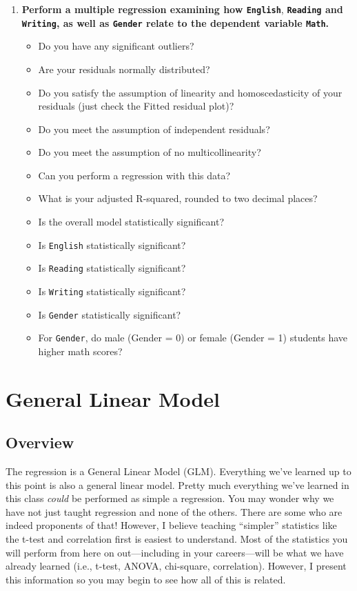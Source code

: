 \documentclass[
]{book}
\begin{document}
\begin{enumerate}
\def\labelenumi{\arabic{enumi}.}
\item
  \textbf{Perform a multiple regression examining how \texttt{English}}, \textbf{\texttt{Reading} and \texttt{Writing}, as well as \texttt{Gender} relate to the dependent variable \texttt{Math}.}

  \begin{itemize}
  \item
    Do you have any significant outliers?
  \item
    Are your residuals normally distributed?
  \item
    Do you satisfy the assumption of linearity and homoscedasticity of your residuals (just check the Fitted residual plot)?
  \item
    Do you meet the assumption of independent residuals?
  \item
    Do you meet the assumption of no multicollinearity?
  \item
    Can you perform a regression with this data?
  \item
    What is your adjusted R-squared, rounded to two decimal places?
  \item
    Is the overall model statistically significant?
  \item
    Is \texttt{English} statistically significant?
  \item
    Is \texttt{Reading} statistically significant?
  \item
    Is \texttt{Writing} statistically significant?
  \item
    Is \texttt{Gender} statistically significant?
  \item
    For \texttt{Gender}, do male (Gender = 0) or female (Gender = 1) students have higher math scores?
  \end{itemize}
\end{enumerate}

\hypertarget{general-linear-model}{%
\section{General Linear Model}\label{general-linear-model}}

\hypertarget{overview-12}{%
\subsection{Overview}\label{overview-12}}

The regression is a General Linear Model (GLM). Everything we've learned up to this point is also a general linear model. Pretty much everything we've learned in this class \emph{could} be performed as simple a regression. You may wonder why we have not just taught regression and none of the others. There are some who are indeed proponents of that! However, I believe teaching ``simpler'' statistics like the t-test and correlation first is easiest to understand. Most of the statistics you will perform from here on out---including in your careers---will be what we have already learned (i.e., t-test, ANOVA, chi-square, correlation). However, I present this information so you may begin to see how all of this is related.
\end{document}
